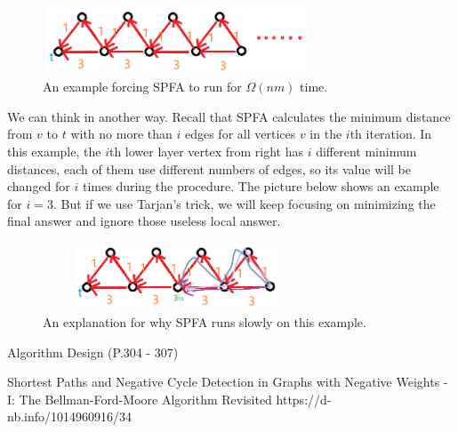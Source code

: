 \documentclass{article}
\begin{document}
\begin{figure}[h]  %
    \centering
    \includegraphics[height=2cm,width=8cm]{figure/1.png}
    \caption{An example forcing SPFA to run for $\Omega(nm)$ time.}
    \label{1}
\end{figure}

We can think in another way. Recall that SPFA calculates the minimum distance from $v$ to $t$ with no more than $i$ edges for all vertices $v$ in the $i$th iteration. In this example, the $i$th lower layer vertex from right has $i$ different minimum distances, each of them use different numbers of edges, so its value will be changed for $i$ times during the procedure. The picture below shows an example for $i=3$. But if we use Tarjan's trick, we will keep focusing on minimizing the final answer and ignore those useless local answer.

\begin{figure}[h]  %
    \centering
    \includegraphics[height=2cm,width=8cm]{figure/2.png}
    \caption{An explanation for why SPFA runs slowly on this example.}
    \label{2}
\end{figure}

\newpage  %

\renewcommand\refname{References}  %
\begin{thebibliography}{99}
     Algorithm Design (P.304 - 307)

     Shortest Paths and Negative Cycle Detection in Graphs with Negative Weights - I: The Bellman-Ford-Moore Algorithm Revisited
    https://d-nb.info/1014960916/34

\end{thebibliography}
\end{document}
